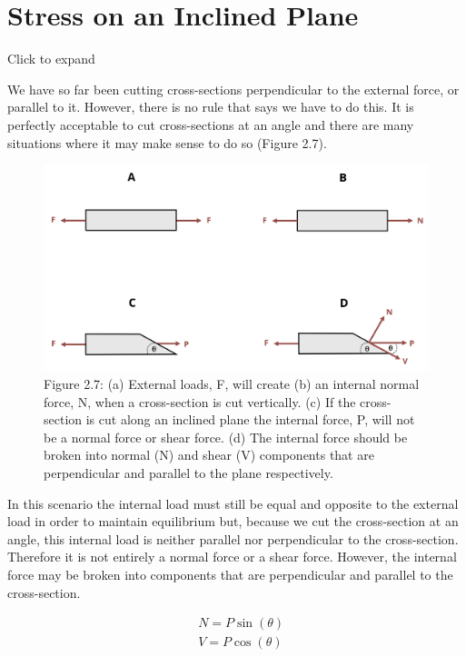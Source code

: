 \documentclass[
  letterpaper,
  DIV=11,
  numbers=noendperiod]{scrreprt}
\begin{document}
\section{Stress on an Inclined Plane}\label{sec-2.4}

Click to expand

We have so far been cutting cross-sections perpendicular to the external
force, or parallel to it. However, there is no rule that says we have to
do this. It is perfectly acceptable to cut cross-sections at an angle
and there are many situations where it may make sense to do so (Figure
2.7).

\begin{figure}[H]

{\centering \includegraphics{images/CH2 figures/2.7.png}

}

\caption{Figure 2.7: (a) External loads, F, will create (b) an internal
normal force, N, when a cross-section is cut vertically. (c) If the
cross-section is cut along an inclined plane the internal force, P, will
not be a normal force or shear force. (d) The internal force should be
broken into normal (N) and shear (V) components that are perpendicular
and parallel to the plane respectively.}

\end{figure}%

In this scenario the internal load must still be equal and opposite to
the external load in order to maintain equilibrium but, because we cut
the cross-section at an angle, this internal load is neither parallel
nor perpendicular to the cross-section. Therefore it is not entirely a
normal force or a shear force. However, the internal force may be broken
into components that are perpendicular and parallel to the
cross-section.

\[
\begin{aligned}
& N=P \sin (\theta) \\
& V=P \cos (\theta)
\end{aligned}
\]
\end{document}
